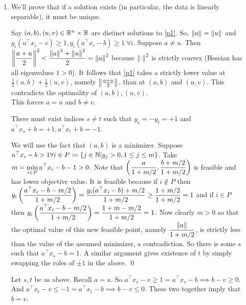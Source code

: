 \begin{enumerate}[leftmargin=*]
\item We'll prove that if a solution exists (in particular, the data is linearly separable), it must be unique.

Say $(a,b), (u,v)\in\mathbb{R}^{n}\times \mathbb{R}$ are distinct solutions to \ref{p1}. So, $\left\lVert a \right\rVert_{} = \left\lVert u \right\rVert_{}$ and $y_{i}(u^{\top}x_{i}-v)\ge 1, y_{i}(a^{\top}x_{i}-b)\ge 1~\forall i$. %
Suppose $a\ne u$. Then $\displaystyle\left\lVert \frac{a+u}{2} \right\rVert_{}^{2} < \frac{\left\lVert a \right\rVert_{}^{2}+\left\lVert u \right\rVert_{}^{2}}{2} = \left\lVert a \right\rVert_{}^{2}$ because $\left\lVert \cdot \right\rVert_{}^{2}$ is strictly convex (Hessian has all eigenvalues $1>0$). It follows that \ref{p1} takes a strictly lower value at $\frac12(a,b)+\frac12(u,v)$, namely $\left\lVert \frac{a+u}{2} \right\rVert_{}$, than at $(a,b)$ and $(u,v)$. This contradicts the optimality of $(a,b),(u,v)$. \\
This forces $a=u$ and $b\ne v$.

\begin{cl}
There must exist indices $s\ne t$ such that $y_{s}=-y_{t}=+1$ and $a^{\top}x_{s}+b = +1, a^{\top}x_{t}+b = -1$.
\end{cl}
\begin{pf}
We will use the fact that $(a,b)$ is a minimizer.  Suppose $a^{\top}x_{i}-b>1\forall i\in P\coloneqq \left\{j\in\mathbb{N}| y_{j}>0, 1\le j\le m\right\}$. Take $\displaystyle m=\min_{i\in P} a^{\top}x_{i}-b-1>0$. Note that $\displaystyle\left(\frac{a}{1+m/2}, \frac{b+m/2}{1+m/2}\right)$ is feasible and has lower objective value. It is feasible because if $i\notin P$ then $\displaystyle y_{i}\left(\frac{a^{\top}x_{i}-b-m/2}{1+m/2}\right) = \frac{y_{i}(a^{\top}x_{i}-b)+m/2}{1+m/2} \ge \frac{1+m/2}{1+m/2} = 1$ and if $i\in P$ then $\displaystyle y_{i}\left(\frac{a^{\top}x_{i}-b-m/2}{1+m/2}\right) = \frac{1+m-m/2}{1+m/2} = 1$. Now clearly $m>0$ so that the optimal value of this new feasible point, namely $\displaystyle\frac{\left\lVert a \right\rVert_{}}{1+m/2}$, is strictly less than the value of the assumed minimizer, a contradiction. So there is some $s$ such that $a^{\top}x_{s}-b=1$. A similar argument gives existence of $t$ by simply swapping the roles of $\pm 1$ in the above.
\qed\end{pf}
Let $s,t$ be as above. Recall $a = u$. So $a^{\top}x_{s}-v\ge 1= a^{\top}x_{s}-b \implies b-v\ge 0$. And $a^{\top}x_{t}-v\le -1= a^{\top}x_{t}-b \implies b-v\le 0$. These two together imply that $b=v$.


\end{enumerate}
